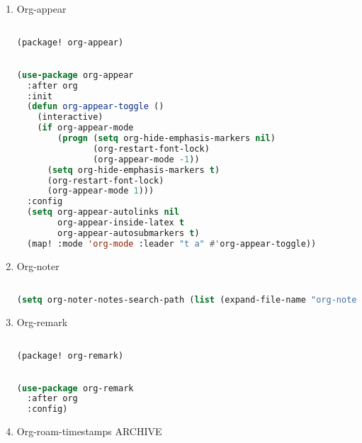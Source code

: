 \documentclass[11pt]{article}
\begin{document}
\begin{enumerate}
  \item Org-appear
  \label{sec:org-appear}

  \begin{lstlisting}[language=Lisp]%! Someone please complete this list for me

(package! org-appear)
\end{lstlisting}

\begin{lstlisting}[language=Lisp]%! Someone please complete this list for me

(use-package org-appear
  :after org
  :init
  (defun org-appear-toggle ()
    (interactive)
    (if org-appear-mode
        (progn (setq org-hide-emphasis-markers nil)
               (org-restart-font-lock)
               (org-appear-mode -1))
      (setq org-hide-emphasis-markers t)
      (org-restart-font-lock)
      (org-appear-mode 1)))
  :config
  (setq org-appear-autolinks nil
        org-appear-inside-latex t
        org-appear-autosubmarkers t)
  (map! :mode 'org-mode :leader "t a" #'org-appear-toggle))
\end{lstlisting}
  \item Org-noter
  \label{sec:org-noter}

  \begin{lstlisting}[language=Lisp]%! Someone please complete this list for me

(setq org-noter-notes-search-path (list (expand-file-name "org-noter" org-roam-directory)))
\end{lstlisting}
  \item Org-remark
  \label{sec:org-remark}

  \begin{lstlisting}[language=Lisp]%! Someone please complete this list for me

(package! org-remark)
\end{lstlisting}

\begin{lstlisting}[language=Lisp]%! Someone please complete this list for me

(use-package org-remark
  :after org
  :config)
\end{lstlisting}
  \item Org-roam-timestamps\hfill{} ARCHIVE
  \label{sec:org-roam-timestamps}

  \begin{lstlisting}[language=Lisp]%! Someone please complete this list for me


\end{lstlisting}
\end{enumerate}
\end{document}
